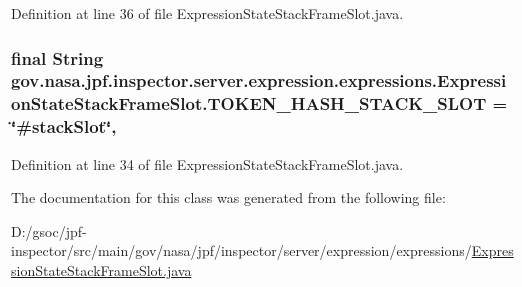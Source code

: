 Definition at line 36 of file Expression\+State\+Stack\+Frame\+Slot.\+java.

\subsubsection[{\texorpdfstring{T\+O\+K\+E\+N\+\_\+\+H\+A\+S\+H\+\_\+\+S\+T\+A\+C\+K\+\_\+\+S\+L\+OT}{TOKEN_HASH_STACK_SLOT}}]{\setlength{\rightskip}{0pt plus 5cm}final String gov.\+nasa.\+jpf.\+inspector.\+server.\+expression.\+expressions.\+Expression\+State\+Stack\+Frame\+Slot.\+T\+O\+K\+E\+N\+\_\+\+H\+A\+S\+H\+\_\+\+S\+T\+A\+C\+K\+\_\+\+S\+L\+OT = \char`\"{}\#stack\+Slot\char`\"{}\hspace{0.3cm}{\ttfamily [static]}, {\ttfamily [private]}}\hypertarget{classgov_1_1nasa_1_1jpf_1_1inspector_1_1server_1_1expression_1_1expressions_1_1_expression_state_stack_frame_slot_a5f4dc5485fda075425d02640fab49c26}{}\label{classgov_1_1nasa_1_1jpf_1_1inspector_1_1server_1_1expression_1_1expressions_1_1_expression_state_stack_frame_slot_a5f4dc5485fda075425d02640fab49c26}


Definition at line 34 of file Expression\+State\+Stack\+Frame\+Slot.\+java.



The documentation for this class was generated from the following file\+:\begin{DoxyCompactItemize}
\item 
D\+:/gsoc/jpf-\/inspector/src/main/gov/nasa/jpf/inspector/server/expression/expressions/\hyperlink{_expression_state_stack_frame_slot_8java}{Expression\+State\+Stack\+Frame\+Slot.\+java}\end{DoxyCompactItemize}
